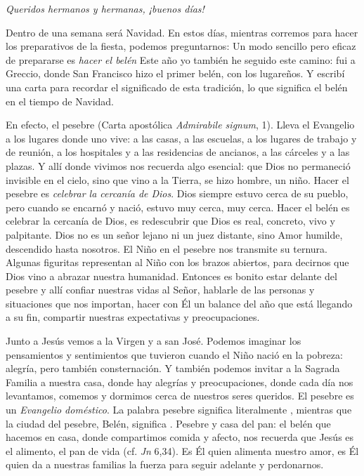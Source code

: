  

\emph{Queridos hermanos y hermanas, ¡buenos días!}

Dentro de una semana será Navidad. En estos días, mientras corremos para hacer los preparativos de la fiesta, podemos preguntarnos:  Un modo sencillo pero eficaz de prepararse es \emph{hacer el belén} Este año yo también he seguido este camino: fui a Greccio, donde San Francisco hizo el primer belén, con los lugareños. Y escribí una carta para recordar el significado de esta tradición, lo que significa el belén en el tiempo de Navidad.

En efecto, el pesebre  (Carta apostólica \emph{Admirabile signum}, 1). Lleva el Evangelio a los lugares donde uno vive: a las casas, a las escuelas, a los lugares de trabajo y de reunión, a los hospitales y a las residencias de ancianos, a las cárceles y a las plazas. Y allí donde vivimos nos recuerda algo esencial: que Dios no permaneció invisible en el cielo, sino que vino a la Tierra, se hizo hombre, un niño. Hacer el pesebre es \emph{celebrar la cercanía de Dios}. Dios siempre estuvo cerca de su pueblo, pero cuando se encarnó y nació, estuvo muy cerca, muy cerca. Hacer el belén es celebrar la cercanía de Dios, es redescubrir que Dios es real, concreto, vivo y palpitante. Dios no es un señor lejano ni un juez distante, sino Amor humilde, descendido hasta nosotros. El Niño en el pesebre nos transmite su ternura. Algunas figuritas representan al Niño con los brazos abiertos, para decirnos que Dios vino a abrazar nuestra humanidad. Entonces es bonito estar delante del pesebre y allí confiar nuestras vidas al Señor, hablarle de las personas y situaciones que nos importan, hacer con Él un balance del año que está llegando a su fin, compartir nuestras expectativas y preocupaciones.

Junto a Jesús vemos a la Virgen y a san José. Podemos imaginar los pensamientos y sentimientos que tuvieron cuando el Niño nació en la pobreza: alegría, pero también consternación. Y también podemos invitar a la Sagrada Familia a nuestra casa, donde hay alegrías y preocupaciones, donde cada día nos levantamos, comemos y dormimos cerca de nuestros seres queridos. El pesebre es un \emph{Evangelio doméstico}. La palabra pesebre significa literalmente , mientras que la ciudad del pesebre, Belén, significa . Pesebre y casa del pan: el belén que hacemos en casa, donde compartimos comida y afecto, nos recuerda que Jesús es el alimento, el pan de vida (cf. \emph{Jn} 6,34). Es Él quien alimenta nuestro amor, es Él quien da a nuestras familias la fuerza para seguir adelante y perdonarnos.

